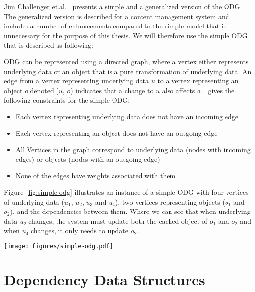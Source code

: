 Jim Challenger et.al.~\cite{paper:ibm-extended} presents a simple and a generalized version of the ODG. The generalized version is described for a content management system and includes a number of enhancements compared to the simple model that is unnecessary for the purpose of this thesis. We will therefore use the simple ODG that is described as following:

ODG can be represented using a directed graph, where a vertex either represents underlying data or an object that is a pure transformation of underlying data. An edge from a vertex representing underlying data $u$ to a vertex representing an object $o$ denoted ($u$, $o$) indicates that a change to $u$ also affects $o$.~\cite{paper:ibm-extended} gives the following constraints for the simple ODG:

\begin{itemize}
  \item Each vertex representing underlying data does not have an incoming edge
  \item Each vertex representing an object does not have an outgoing edge
  \item All Vertices in the graph correspond to underlying data (nodes with incoming edges) or objects (nodes with an outgoing edge)
  \item None of the edges have weights associated with them
\end{itemize}

Figure~\ref{fig:simple-odg} illustrates an instance of a simple ODG with four vertices of underlying data ($u_1$, $u_2$, $u_3$ and $u_4$), two vertices representing objects ($o_1$ and $o_2$), and the dependencies between them. Where we can see that when underlying data $u_2$ changes, the system must update both the cached object of $o_1$ and $o_2$ and when $u_4$ changes, it only needs to update $o_2$.

\begin{figure*}[ht!]
  \centering
  \texttt{[image: figures/simple-odg.pdf]}
  \caption{An example instance of a simple ODG}
  \label{fig:simple-odg}
\end{figure*}


\section{Dependency Data Structures}
\label{sec:dependency-data-structure-for-cachable-functions}

